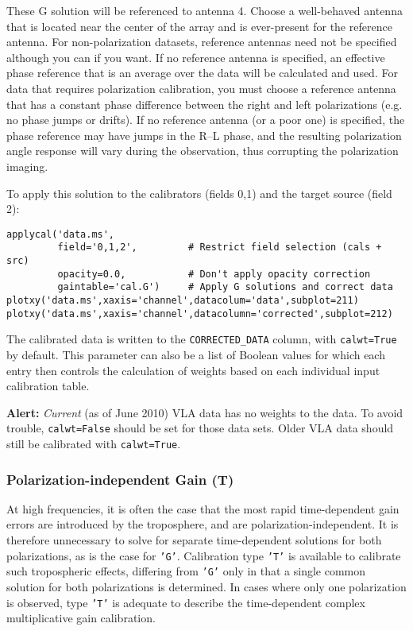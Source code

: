 These G solution will be referenced to antenna 4.  Choose a
well-behaved antenna that is located near the center of the array and
is ever-present for the reference antenna.  For non-polarization
datasets, reference antennas need not be specified although you can if
you want.  If no reference antenna is specified, an effective phase
reference that is an average over the data will be calculated and
used.  For data that requires polarization calibration, you must
choose a reference antenna that has a constant phase difference
between the right and left polarizations (e.g. no phase jumps or
drifts).  If no reference antenna (or a poor one) is specified, the
phase reference may have jumps in the R--L phase, and the resulting
polarization angle response will vary during the observation, thus
corrupting the polarization imaging.

To apply this solution to the calibrators (fields 0,1) and the target source (field
2):
\small
\begin{verbatim}
applycal('data.ms',
         field='0,1,2',         # Restrict field selection (cals + src)
         opacity=0.0,           # Don't apply opacity correction
         gaintable='cal.G')     # Apply G solutions and correct data
plotxy('data.ms',xaxis='channel',datacolum='data',subplot=211)
plotxy('data.ms',xaxis='channel',datacolumn='corrected',subplot=212)
\end{verbatim}
\normalsize
The calibrated data is written to the {\tt CORRECTED\_DATA} column, with 
{\tt calwt=True} by default. This parameter can also be a list of
Boolean values for which each entry then controls the calculation of
weights based on each individual input calibration table. 

{\bf Alert:} {\it Current} (as of June 2010)  VLA data has no weights
to the data. To avoid trouble, {\tt calwt=False} should be set for
those data sets. Older VLA data should still be calibrated with  {\tt calwt=True}.

\subsubsection{Polarization-independent Gain (T)}
\label{section:cal.solve.gain.t}

At high frequencies, it is often the case that the most rapid
time-dependent gain errors are introduced by the troposphere, and are
polarization-independent.  It is therefore unnecessary to solve for
separate time-dependent solutions for both polarizations, as is the
case for {\tt 'G'}.  Calibration type {\tt 'T'} is available to calibrate such
tropospheric effects, differing from {\tt 'G'} only in that a single common
solution for both polarizations is determined.  In cases where only
one polarization is observed, type {\tt 'T'} is adequate to describe the
time-dependent complex multiplicative gain calibration.

